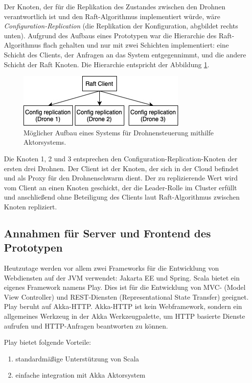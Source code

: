 Der Knoten, der für die Replikation des Zustandes zwischen den Drohnen verantwortlich ist und den Raft-Algorithmus implementiert würde, wäre \textit{Configuration-Replication} (die Replikation der Konfiguration, abgbildet rechts unten). Aufgrund des Aufbaus eines Prototypen war die Hierarchie des Raft-Algorithmus flach gehalten und nur mit zwei Schichten implementiert: eine Schicht des Clients, der Anfragen an das System entgegennimmt, und die andere Schicht der Raft Knoten. Die Hierarchie entspricht der Abbildung \ref{fig:hierarchy2}.

\begin{figure}
	\centering
	\includegraphics[width=0.7\linewidth]{images/6_hierarchy_2}
	\caption{Möglicher Aufbau eines Systems für Drohnensteuerung mithilfe Aktorsystems.}
	\label{fig:hierarchy2}
\end{figure}

Die Knoten 1, 2 und 3 entsprechen den Configuration-Replication-Knoten der ersten drei Drohnen. Der Client ist der Knoten, der sich in der Cloud befindet und als Proxy für den Drohnenschwarm dient. Der zu replizierende Wert wird vom Client an einen Knoten geschickt, der die Leader-Rolle im Cluster erfüllt und anschließend ohne Beteiligung des Clients laut Raft-Algorithmus zwischen Knoten repliziert.

\subsection{Annahmen für Server und Frontend des Prototypen}

Heutzutage werden vor allem zwei Frameworks für die Entwicklung von Webdiensten auf der JVM verwendet: Jakarta EE und Spring. Scala bietet ein eigenes Framework namens Play. Dies ist für die Entwicklung von  MVC- (Model View Controller) und REST-Diensten (Representational State Transfer) geeignet. Play beruht auf Akka-HTTP. Akka-HTTP ist kein Webframework, sondern ein allgemeines Werkzeug in der Akka Werkzeugpalette, um HTTP basierte Dienste aufrufen und HTTP-Anfragen beantworten zu können.

Play bietet folgende Vorteile:

\begin{enumerate}
	\item standardmäßige Unterstützung von Scala
	
	\item einfache integration mit Akka Aktorsystem
\end{enumerate}

